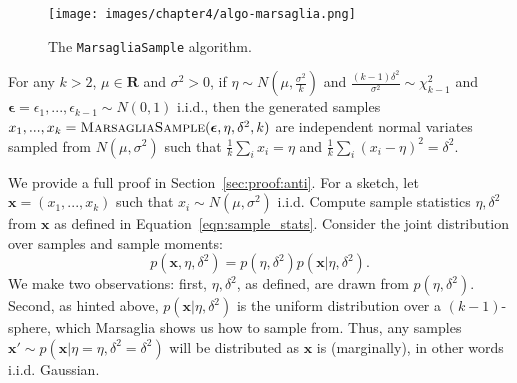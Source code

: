 \begin{figure}
    \centering
    \texttt{[image: images/chapter4/algo-marsaglia.png]}
    \caption{The \texttt{MarsagliaSample} algorithm.}
    \label{algo:marsaglia}
\end{figure}

\begin{prop}
    For any $k>2$, $\mu \in \mathbf{R}$ and $\sigma^2>0$, if $\eta \sim N(\mu, \frac{\sigma^2}{k})$ and $\frac{(k-1)\delta^2}{\sigma^2} \sim \chi^2_{k-1}$ and $\boldsymbol{\epsilon} = \epsilon_1, ..., \epsilon_{k-1} \sim N(0, 1)$ i.i.d., then the generated samples $x_1, ..., x_k = \textsc{MarsagliaSample}(\boldsymbol{\epsilon}, \eta, \delta^2,k)$ are independent normal variates sampled from $N(\mu, \sigma^2)$ such that $\frac{1}{k}\sum_i x_i = \eta$ and $\frac{1}{k}\sum_i(x_i - \eta)^2 = \delta^2$.
    \label{prop:marsaglia}
\end{prop}
\begin{sketch}We provide a full proof in Section~\ref{sec:proof:anti}. For a sketch, let $\mathbf{x} = (x_1, ..., x_k)$ such that $x_i \sim N(\mu, \sigma^2)$ i.i.d. Compute sample statistics $\eta, \delta^2$ from $\mathbf{x}$ as defined in Equation~\ref{eqn:sample_stats}. Consider the joint distribution over samples and sample moments:
\begin{equation*}
    p(\mathbf{x},\eta,\delta^2) = p(\eta,\delta^2)p(\mathbf{x}|\eta,\delta^2).
\end{equation*}
We make two observations: first, $\eta,\delta^2$, as defined, are drawn from $p(\eta,\delta^2)$. Second, as hinted above, $p(\mathbf{x}|\eta,\delta^2)$ is the uniform distribution over a $(k-1)$-sphere, which Marsaglia shows us how to sample from. Thus, any samples $\mathbf{x'} \sim p(\mathbf{x}|\eta=\eta,\delta^2=\delta^2)$ will be distributed as $\mathbf{x}$ is (marginally), in other words i.i.d. Gaussian.
\end{sketch}


